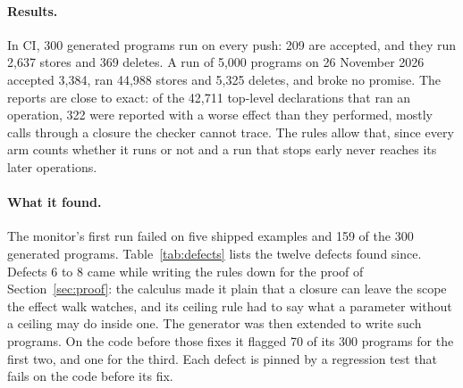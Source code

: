 \documentclass[11pt,a4paper]{article}
\begin{document}
\paragraph{Results.} In CI, 300 generated programs run on every push:
209 are accepted, and they run 2,637 stores and 369 deletes. A run of
5,000 programs on 26 November 2026 accepted 3,384, ran 44,988 stores and
5,325 deletes, and broke no promise. The reports are close to exact: of
the 42,711 top-level declarations that ran an operation, 322 were
reported with a worse effect than they performed, mostly calls through a
closure the checker cannot trace. The rules allow that, since every arm
counts whether it runs or not and a run that stops early never reaches
its later operations.

\paragraph{What it found.} The monitor's first run failed on five shipped
examples and 159 of the 300 generated programs. Table~\ref{tab:defects}
lists the twelve defects found since. Defects 6 to 8 came while writing
the rules down for the proof of Section~\ref{sec:proof}: the calculus
made it plain that a closure can leave the scope the effect walk watches,
and its ceiling rule had to say what a parameter without a ceiling may
do inside one. The generator was then extended to write such programs.
On the code before those fixes it flagged 70 of its 300 programs for the
first two, and one for the third. Each defect is pinned by a regression
test that fails on the code before its fix.
\end{document}
